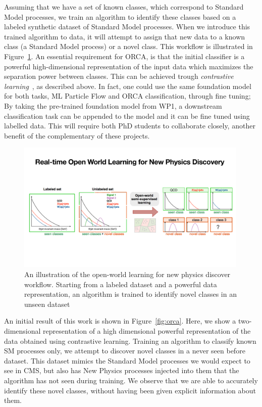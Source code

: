 \documentclass[12pt]{iopart}
\begin{document}
Assuming that we have a set of known classes, which correspond to Standard Model processes, we train an algorithm to identify these classes based on a labeled synthetic dataset of Standard Model processes. When we introduce this trained algorithm to data, it will attempt to assign that new data to a known class (a Standard Model process) or a novel class. This workflow is illustrated in Figure~\ref{fig:ow}. An essential requirement for ORCA, is that the initial classifier is a powerful high-dimensional representation of the input data which maximizes the separation power between classes. This can be achieved trough \textit{contrastive learning}~\cite{chen2020simple}, as described above. In fact, one could use the same foundation model for both tasks, ML Particle Flow and ORCA classification, through fine tuning; By taking the pre-trained foundation model from WP1, a downstream classification task can be appended to the model and it can be fine tuned using labelled data. This will require both PhD students to collaborate closely, another benefit of the complementary of these projects.
\begin{figure}[ht!]
    \centering
    \includegraphics[width=0.99\textwidth]{figures/orca_np}
    \caption{An illustration of the open-world learning for new physics discover workflow. Starting from a labeled dataset and a powerful data representation, an algorithm is trained to identify novel classes in an unseen dataset}
    \label{fig:ow}
\end{figure}

An initial result of this work is shown in Figure~\ref{fig:orca}. Here, we show a two-dimensional representation of a high dimensional powerful representation of the data obtained using contrastive learning. Training an algorithm to classify known SM processes only, we attempt to discover novel classes in a never seen before dataset. This dataset mimics the Standard Model processes we would expect to see in CMS, but also has New Physics processes injected into them that the algorithm has not seen during training. We observe that we are able to accurately identify these novel classes, without having been given explicit information about them.
\end{document}
